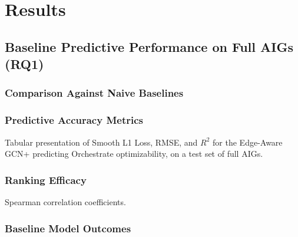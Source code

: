 \chapter{Results}
\label{sec:results}


\section{Baseline Predictive Performance on Full AIGs (RQ1)}
\label{sec:results:rq1}

\subsection{Comparison Against Naive Baselines}
\label{sec:results:rq1:baselines}

\subsection{Predictive Accuracy Metrics}
\label{sec:results:rq1:accuracy}
Tabular presentation of Smooth L1 Loss, RMSE, and $R^2$ for the Edge-Aware GCN+ predicting
Orchestrate optimizability, on a test set of full AIGs.


\subsection{Ranking Efficacy}
\label{sec:results:rq1:ranking}
Spearman correlation coefficients.

\subsection{Baseline Model Outcomes}
\label{sec:results:rq1:baselinemodels}

